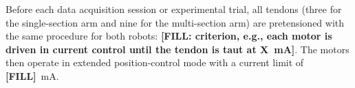 Before each data acquisition session or experimental trial, all tendons (three for the single-section arm and nine for the multi-section arm) are pretensioned with the same procedure for both robots: \textbf{[FILL: criterion, e.g., each motor is driven in current control until the tendon is taut at X~mA]}. The motors then operate in extended position-control mode with a current limit of \textbf{[FILL]}~mA.

